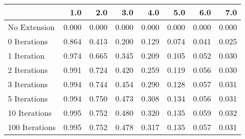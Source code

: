 \begin{tabular}{lrrrrrrr}
\toprule
{} &   1.0 &   2.0 &   3.0 &   4.0 &   5.0 &   6.0 &   7.0 \\
\midrule
No Extension   & 0.000 & 0.000 & 0.000 & 0.000 & 0.000 & 0.000 & 0.000 \\
0 Iterations   & 0.864 & 0.413 & 0.200 & 0.129 & 0.074 & 0.041 & 0.025 \\
1 Iteration    & 0.974 & 0.665 & 0.345 & 0.209 & 0.105 & 0.052 & 0.030 \\
2 Iterations   & 0.991 & 0.724 & 0.420 & 0.259 & 0.119 & 0.056 & 0.030 \\
3 Iterations   & 0.994 & 0.744 & 0.454 & 0.290 & 0.128 & 0.057 & 0.031 \\
5 Iterations   & 0.994 & 0.750 & 0.473 & 0.308 & 0.134 & 0.056 & 0.031 \\
10 Iterations  & 0.995 & 0.752 & 0.480 & 0.320 & 0.135 & 0.059 & 0.032 \\
100 Iterations & 0.995 & 0.752 & 0.478 & 0.317 & 0.135 & 0.057 & 0.031 \\
\bottomrule
\end{tabular}
